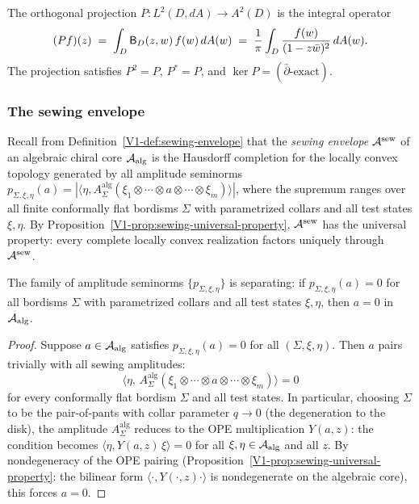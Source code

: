\begin{lemma}%
%
The orthogonal projection
$P \colon L^2(D, dA) \to A^2(D)$ is the integral operator
\[
(Pf)(z)
\;=\;
\int_D \mathsf{B}_D(z,w)\,f(w)\,dA(w)
\;=\;
\frac{1}{\pi}\int_D \frac{f(w)}{(1-z\bar{w})^2}\,dA(w).
\]
The projection satisfies $P^2 = P$, $P^* = P$, and
$\ker P = (\bar{\partial}\text{-exact})$.
\end{lemma}

\subsubsection{The sewing envelope}

\begin{definition}%
%
Recall from Definition~\ref{V1-def:sewing-envelope} that
the \emph{sewing envelope} $\mathcal{A}^{\mathrm{sew}}$ of an algebraic chiral
core $\mathcal{A}_{\mathrm{alg}}$ is the Hausdorff completion
for the locally convex topology generated by all amplitude
seminorms $p_{\Sigma,\xi,\eta}(a)
= |\langle \eta, A_\Sigma^{\mathrm{alg}}(\xi_1 \otimes \cdots
\otimes a \otimes \cdots \otimes \xi_m)\rangle|$,
where the supremum ranges over all finite conformally flat
bordisms $\Sigma$ with parametrized collars and all
test states $\xi, \eta$. By Proposition~\ref{V1-prop:sewing-universal-property},
$\mathcal{A}^{\mathrm{sew}}$ has the universal property: every complete locally convex
realization factors uniquely through~$\mathcal{A}^{\mathrm{sew}}$.
\end{definition}

\begin{lemma}%
%
The family of amplitude seminorms
$\{p_{\Sigma,\xi,\eta}\}$ is separating: if
$p_{\Sigma,\xi,\eta}(a) = 0$ for all bordisms $\Sigma$ with
parametrized collars and all test states $\xi, \eta$, then
$a = 0$ in~$\mathcal{A}_{\mathrm{alg}}$.
\end{lemma}

\begin{proof}
Suppose $a \in \mathcal{A}_{\mathrm{alg}}$ satisfies
$p_{\Sigma,\xi,\eta}(a) = 0$ for all $(\Sigma,\xi,\eta)$.
Then $a$ pairs trivially with all sewing amplitudes:
\[
\langle \eta,\, A_\Sigma^{\mathrm{alg}}(\xi_1 \otimes
\cdots \otimes a \otimes \cdots \otimes \xi_m)\rangle = 0
\]
for every conformally flat bordism $\Sigma$ and all test
states. In particular, choosing $\Sigma$ to be the
pair-of-pants with collar parameter $q \to 0$
(the degeneration to the disk), the amplitude
$A_\Sigma^{\mathrm{alg}}$ reduces to the OPE
multiplication $Y(a,z)$: the condition becomes
$\langle \eta, Y(a,z)\,\xi\rangle = 0$ for all
$\xi, \eta \in \mathcal{A}_{\mathrm{alg}}$ and all $z$. By nondegeneracy of
the OPE pairing
(Proposition~\textup{\ref{V1-prop:sewing-universal-property}}:
the bilinear form $\langle\cdot,Y(\cdot,z)\cdot\rangle$
is nondegenerate on the algebraic core),
this forces $a = 0$.
\end{proof}

